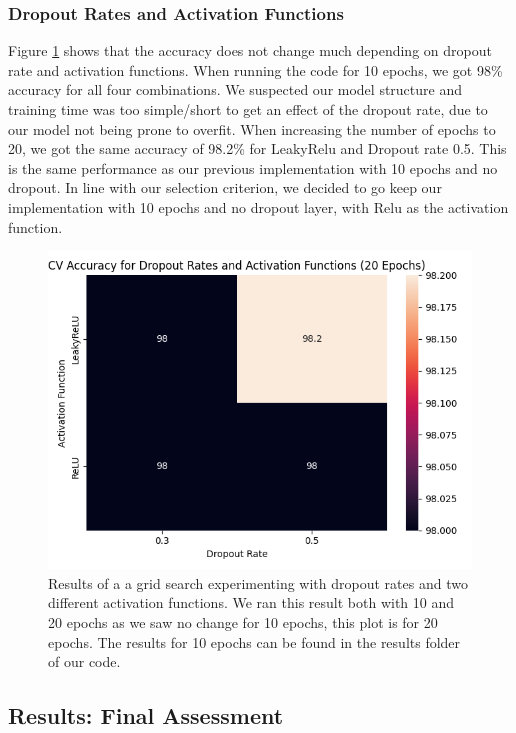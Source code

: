 \newpage
\subsubsection{Dropout Rates and Activation Functions}
 Figure \ref{fig:cnn_pp} shows that the accuracy does not change much depending on dropout rate and activation functions. When running the code for 10 epochs, we got 98\% accuracy for all four combinations. We suspected our model structure and training time was too simple/short to get an effect of the dropout rate, due to our model not being prone to overfit. When increasing the number of epochs to 20, we got the same accuracy of 98.2\% for LeakyRelu and Dropout rate 0.5. This is the same performance as our previous implementation with 10 epochs and no dropout. In line with our selection criterion, we decided to go keep our implementation with 10 epochs and no dropout layer, with Relu as the activation function. 

\begin{figure}[h]
    \centering
    \includegraphics[width=\linewidth]{results/cnn_grid_search/heatmap_grid_search_da.png}
    \caption{Results of a a grid search experimenting with dropout rates and two different activation functions. We ran this result both with 10 and 20 epochs as we saw no change for 10 epochs, this plot is for 20 epochs. The results for 10 epochs can be found in the results folder of our code.}
    \label{fig:cnn_pp}
\end{figure}

\subsection{Results: Final Assessment}

